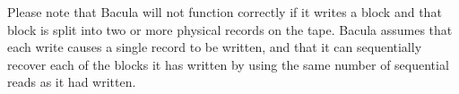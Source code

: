 Please note that Bacula will not function correctly if it writes a block and
that block is split into two or more physical records on the tape. Bacula
assumes that each write causes a single record to be written, and that it can
sequentially recover each of the blocks it has written by using the same
number of sequential reads as it had written. 
